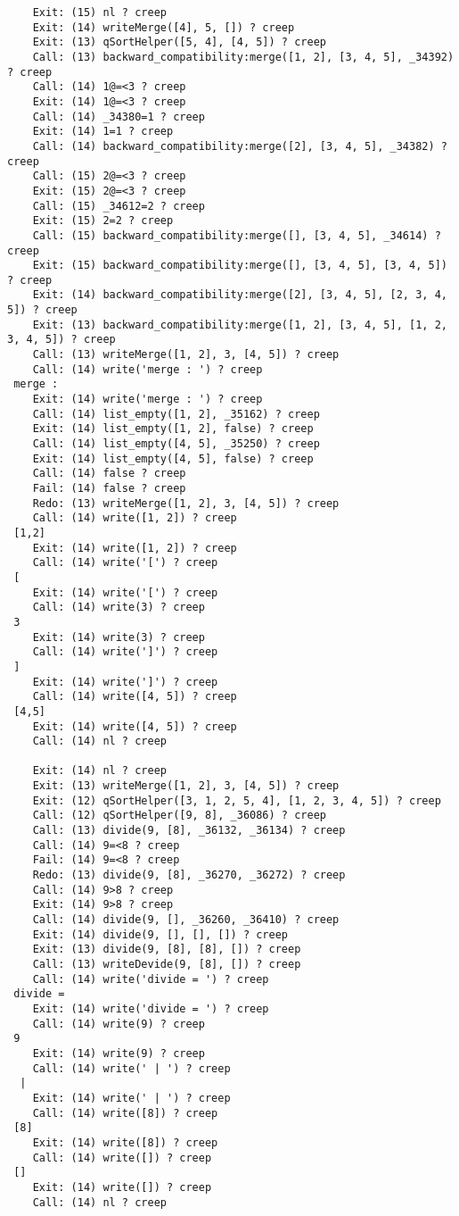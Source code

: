 \documentclass{article}
\begin{document}
\begin{lstlisting}
	Exit: (15) nl ? creep
	Exit: (14) writeMerge([4], 5, []) ? creep
	Exit: (13) qSortHelper([5, 4], [4, 5]) ? creep
	Call: (13) backward_compatibility:merge([1, 2], [3, 4, 5], _34392) ? creep
	Call: (14) 1@=<3 ? creep
	Exit: (14) 1@=<3 ? creep
	Call: (14) _34380=1 ? creep
	Exit: (14) 1=1 ? creep
	Call: (14) backward_compatibility:merge([2], [3, 4, 5], _34382) ? creep
	Call: (15) 2@=<3 ? creep
	Exit: (15) 2@=<3 ? creep
	Call: (15) _34612=2 ? creep
	Exit: (15) 2=2 ? creep
	Call: (15) backward_compatibility:merge([], [3, 4, 5], _34614) ? creep
	Exit: (15) backward_compatibility:merge([], [3, 4, 5], [3, 4, 5]) ? creep
	Exit: (14) backward_compatibility:merge([2], [3, 4, 5], [2, 3, 4, 5]) ? creep
	Exit: (13) backward_compatibility:merge([1, 2], [3, 4, 5], [1, 2, 3, 4, 5]) ? creep
	Call: (13) writeMerge([1, 2], 3, [4, 5]) ? creep
	Call: (14) write('merge : ') ? creep
 merge :
	Exit: (14) write('merge : ') ? creep
	Call: (14) list_empty([1, 2], _35162) ? creep
	Exit: (14) list_empty([1, 2], false) ? creep
	Call: (14) list_empty([4, 5], _35250) ? creep
	Exit: (14) list_empty([4, 5], false) ? creep
	Call: (14) false ? creep
	Fail: (14) false ? creep
	Redo: (13) writeMerge([1, 2], 3, [4, 5]) ? creep
	Call: (14) write([1, 2]) ? creep
 [1,2]
	Exit: (14) write([1, 2]) ? creep
	Call: (14) write('[') ? creep
 [
	Exit: (14) write('[') ? creep
	Call: (14) write(3) ? creep
 3
	Exit: (14) write(3) ? creep
	Call: (14) write(']') ? creep
 ]
	Exit: (14) write(']') ? creep
	Call: (14) write([4, 5]) ? creep
 [4,5]
	Exit: (14) write([4, 5]) ? creep
	Call: (14) nl ? creep
 
	Exit: (14) nl ? creep
	Exit: (13) writeMerge([1, 2], 3, [4, 5]) ? creep
	Exit: (12) qSortHelper([3, 1, 2, 5, 4], [1, 2, 3, 4, 5]) ? creep
	Call: (12) qSortHelper([9, 8], _36086) ? creep
	Call: (13) divide(9, [8], _36132, _36134) ? creep
	Call: (14) 9=<8 ? creep
	Fail: (14) 9=<8 ? creep
	Redo: (13) divide(9, [8], _36270, _36272) ? creep
	Call: (14) 9>8 ? creep
	Exit: (14) 9>8 ? creep
	Call: (14) divide(9, [], _36260, _36410) ? creep
	Exit: (14) divide(9, [], [], []) ? creep
	Exit: (13) divide(9, [8], [8], []) ? creep
	Call: (13) writeDevide(9, [8], []) ? creep
	Call: (14) write('divide = ') ? creep
 divide =
	Exit: (14) write('divide = ') ? creep
	Call: (14) write(9) ? creep
 9
	Exit: (14) write(9) ? creep
	Call: (14) write(' | ') ? creep
  |
	Exit: (14) write(' | ') ? creep
	Call: (14) write([8]) ? creep
 [8]
	Exit: (14) write([8]) ? creep
	Call: (14) write([]) ? creep
 []
	Exit: (14) write([]) ? creep
	Call: (14) nl ? creep
 

\end{lstlisting}
\end{document}
